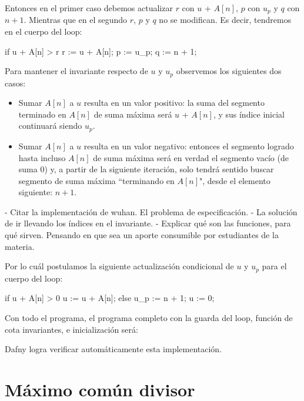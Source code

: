 \documentclass[12pt, a4paper, openany, fleqn]{book}
\begin{document}
    Entonces en el primer caso debemos actualizar $r$ con $u$ + $A[n]$, $p$ con $u_p$ y $q$ con $n+1$. Mientras que en el segundo $r$, $p$ y $q$ no se modifican. Es decir, tendremos en el cuerpo del loop:
    \begin{dafny}
        if u + A[n] > r {
            r := u + A[n];
            p := u_p;
            q := n + 1;
        }
    \end{dafny}

    Para mantener el invariante respecto de $u$ y $u_p$ observemos los siguientes dos casos:
    \begin{itemize}
        \item Sumar $A[n]$ a $u$ resulta en un valor positivo: la suma del segmento terminado en $A[n]$ de suma máxima será $u$ + $A[n]$, y sus índice inicial continuará siendo $u_p$.
        \item Sumar $A[n]$ a $u$ resulta en un valor negativo: entonces el segmento logrado hasta incluso $A[n]$ de suma máxima será en verdad el segmento vacío (de suma 0) y, a partir de la siguiente iteración, solo tendrá sentido buscar segmento de suma máxima ``terminando en $A[n]$", desde el elemento siguiente: $n + 1$.
    \end{itemize}

    - Citar la implementación de wuhan. El problema de especificación.
    - La solución de ir llevando los índices en el invariante.
    - Explicar qué son las funciones, para qué sirven. Pensando en que sea un aporte consumible por estudiantes de la materia.

    Por lo cuál postulamos la siguiente actualización condicional de $u$ y $u_p$ para el cuerpo del loop:
    \begin{dafny}
        if u + A[n] > 0 {
            u := u + A[n];
        } else {
            u_p := n + 1;
            u := 0;
        }
    \end{dafny}

    Con todo el programa, el programa completo con la guarda del loop, función de cota invariantes, e inicialización será:


    Dafny logra verificar automáticamente esta implementación.

    \chapter{Máximo común divisor}
\end{document}
